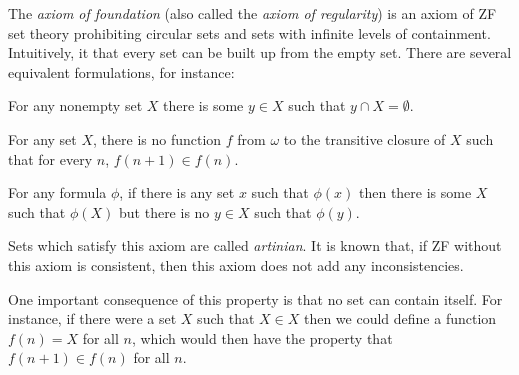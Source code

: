 \documentclass[12pt]{article}
\begin{document}
The \emph{axiom of foundation} (also called the \emph{axiom of regularity}) is an axiom of ZF set theory prohibiting circular sets and sets with infinite levels of containment.  Intuitively, it  that every set can be built up from the empty set.  There are several equivalent formulations, for instance:

For any nonempty set $X$ there is some $y\in X$ such that $y\cap X=\emptyset$.

For any set $X$, there is no function $f$ from $\omega$ to the transitive closure of $X$ such that for every $n$, $f(n+1)\in f(n)$.

For any formula $\phi$, if there is any set $x$ such that $\phi(x)$ then there is some $X$ such that $\phi(X)$ but there is no $y\in X$ such that $\phi(y)$.

Sets which satisfy this axiom are called \emph{artinian}.  It is known that, if ZF without this axiom is consistent, then this axiom does not add any inconsistencies.

One important consequence of this property is that no set can contain itself.  For instance, if there were a set $X$ such that $X\in X$ then we could define a function $f(n)=X$ for all $n$, which would then have the property that $f(n+1)\in f(n)$ for all $n$.
\end{document}
